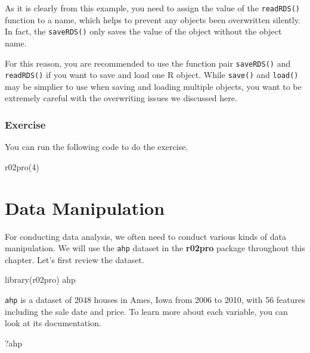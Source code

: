 \documentclass[
]{book}
\newenvironment{Shaded}{\begin{snugshade}}{\end{snugshade}}
\newcommand{\DecValTok}[1]{\textcolor[rgb]{0.00,0.00,0.81}{#1}}
\newcommand{\FunctionTok}[1]{\textcolor[rgb]{0.00,0.00,0.00}{#1}}
\newcommand{\NormalTok}[1]{#1}
\begin{document}
As it is clearly from this example, you need to assign the value of the \texttt{readRDS()} function to a name, which helps to prevent any objects been overwritten silently. In fact, the \texttt{saveRDS()} only saves the value of the object without the object name.

For this reason, you are recommended to use the function pair \texttt{saveRDS()} and \texttt{readRDS()} if you want to save and load one R object. While \texttt{save()} and \texttt{load()} may be simplier to use when saving and loading multiple objects, you want to be extremely careful with the overwriting issues we discussed here.

\hypertarget{exercise-10}{%
\subsection{Exercise}\label{exercise-10}}

You can run the following code to do the exercise.

\begin{Shaded}
\begin{Highlighting}[]
\FunctionTok{r02pro}\NormalTok{(}\DecValTok{4}\NormalTok{)}
\end{Highlighting}
\end{Shaded}

\hypertarget{data-manipulation}{%
\chapter{Data Manipulation}\label{data-manipulation}}

For conducting data analysis, we often need to conduct various kinds of data manipulation. We will use the \texttt{ahp} dataset in the \textbf{r02pro} package throughout this chapter. Let's first review the dataset.

\begin{Shaded}
\begin{Highlighting}[]
\FunctionTok{library}\NormalTok{(r02pro)}
\NormalTok{ahp}
\end{Highlighting}
\end{Shaded}

\texttt{ahp} is a dataset of 2048 houses in Ames, Iowa from 2006 to 2010, with 56 features including the sale date and price. To learn more about each variable, you can look at its documentation.

\begin{Shaded}
\begin{Highlighting}[]
\NormalTok{?ahp}
\end{Highlighting}
\end{Shaded}
\end{document}
